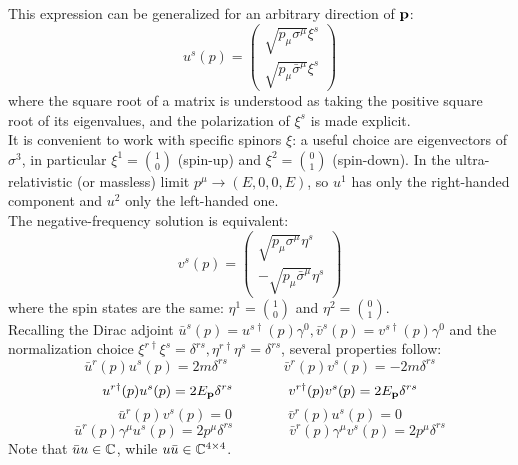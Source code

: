 This expression can be generalized for an arbitrary direction of $ \mathbf{p} $:
\begin{equation}
  u^s(p) =
  \begin{pmatrix}
    \sqrt{p_\mu \sigma^\mu} \xi^s \\
    \sqrt{p_\mu \bar{\sigma}^\mu} \xi^s
  \end{pmatrix}
  \label{eq:1.90}
\end{equation}
where the square root of a matrix is understood as taking the positive square root of its eigenvalues, and the polarization of $ \xi^s $ is made explicit.\\
It is convenient to work with specific spinors $ \xi $: a useful choice are eigenvectors of $ \sigma^3 $, in particular $ \xi^1 = \binom{1}{0} $ (spin-up) and $ \xi^2 = \binom{0}{1} $ (spin-down). In the ultra-relativistic (or massless) limit $ p^\mu \rightarrow (E, 0, 0, E) $, so $ u^1 $ has only the right-handed component and $ u^2 $ only the left-handed one.\\
The negative-frequency solution is equivalent:
\begin{equation}
  v^s(p) =
    \begin{pmatrix}
      \sqrt{p_\mu \sigma^\mu} \eta^s \\
      -\sqrt{p_\mu \bar{\sigma}^\mu} \eta^s
    \end{pmatrix}
  \label{eq:1.91}
\end{equation}
where the spin states are the same: $ \eta^1 = \binom{1}{0} $ and $ \eta^2 = \binom{0}{1} $.\\
Recalling the Dirac adjoint $ \bar{u}^s(p) = u^{s \dagger}(p) \gamma^0 , \bar{v}^s(p) = v^{s \dagger}(p) \gamma^0 $ and the normalization choice $ \xi^{r \dagger} \xi^s = \delta^{rs} , \eta^{r \dagger} \eta^s = \delta^{rs} $, several properties follow:
\begin{equation}
  \bar{u}^r(p) u^s(p) = 2m \delta^{rs}
  \qquad \qquad
  \bar{v}^r(p) v^s(p) = -2m \delta^{rs}
  \label{eq:1.92}
\end{equation}
\begin{equation}
  u^{r \dagger}(p) u^s(p) = 2E_{\mathbf{p}} \delta^{rs}
  \qquad \qquad
  v^{r \dagger}(p) v^s(p) = 2E_{\mathbf{p}} \delta^{rs}
  \label{eq:1.93}
\end{equation}
\begin{equation}
  \bar{u}^r(p) v^s(p) = 0
  \qquad \qquad
  \bar{v}^r(p) u^s(p) = 0
  \label{eq:1.94}
\end{equation}
\begin{equation}
  \bar{u}^r(p) \gamma^\mu u^s(p) = 2 p^\mu \delta^{rs}
  \qquad \qquad
  \bar{v}^r(p) \gamma^\mu v^s(p) = 2 p^\mu \delta^{rs}
  \label{eq:1.95}
\end{equation}
Note that $ \bar{u}u \in \mathbb{C} $, while $ u\bar{u} \in \mathbb{C}^{4 \times 4} $.

